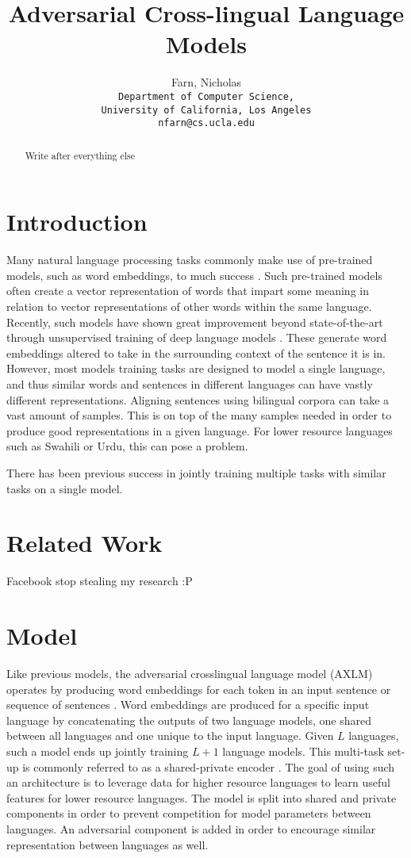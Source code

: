 \documentclass[10pt,letterpaper,twocolumn]{article}
\title{Adversarial Cross-lingual Language Models}
\author{Farn, Nicholas\\
	\texttt{Department of Computer Science,}\\
	\texttt{University of California, Los Angeles}\\
	\texttt{nfarn@cs.ucla.edu}
}
\begin{document}
\maketitle
\begin{abstract}
Write after everything else
\end{abstract}

\section{Introduction}
Many natural language processing tasks commonly make use of pre-trained models, such as word embeddings, to much success \cite{}.  Such pre-trained models often create a vector representation of words that impart some meaning in relation to vector representations of other words within the same language.  Recently, such models have shown great improvement beyond state-of-the-art through unsupervised training of deep language models \cite{bert, openai, elmo}.  These generate word embeddings altered to take in the surrounding context of the sentence it is in.  However, most models training tasks are designed to model a single language, and thus similar words and sentences in different languages can have vastly different representations.  Aligning sentences using bilingual corpora can take a vast amount of samples.  This is on top of the many samples needed in order to produce good representations in a given language.  For lower resource languages such as Swahili or Urdu, this can pose a problem.  

There has been previous success in jointly training multiple tasks with similar tasks on a single model.

\section{Related Work}
Facebook stop stealing my research :P

\section{Model}
Like previous models, the adversarial crosslingual language model (AXLM) operates by producing word embeddings for each token in an input sentence or sequence of sentences \cite{bert, openai, elmo, xlm}.  Word embeddings are produced for a specific input language by concatenating the outputs of two language models, one shared between all languages and one unique to the input language.  Given $L$ languages, such a model ends up jointly training $L+1$ language models.  This multi-task set-up is commonly referred to as a shared-private encoder \cite{Chen16}.  The goal of using such an architecture is to leverage data for higher resource languages to learn useful features for lower resource languages.  The model is split into shared and private components in order to prevent competition for model parameters between languages.  An adversarial component is added in order to encourage similar representation between languages as well.
\end{document}
